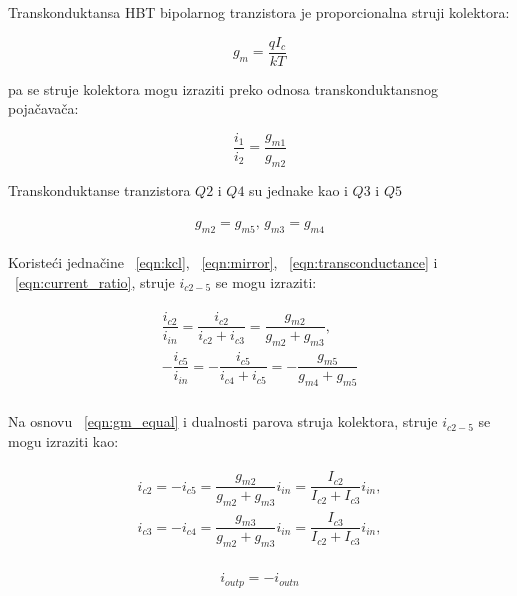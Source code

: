 \documentclass[journal,twocolumn,letterpaper]{IEEEJERM}
\begin{document}
Transkonduktansa HBT bipolarnog tranzistora je proporcionalna struji kolektora:

\begin{equation}
  \label{eqn:transconductance}
  g_{m} = \dfrac{qI_c}{kT}
\end{equation}

pa se struje kolektora mogu izraziti preko odnosa transkonduktansnog pojačavača:

\begin{equation}
  \label{eqn:current_ratio}
  \dfrac{i_1}{i_2} = \dfrac{g_{m1}}{g_{m2}}
\end{equation}

Transkonduktanse tranzistora $Q2$ i $Q4$ su jednake kao i $Q3$ i $Q5$

\begin{align}
  \label{eqn:gm_equal}
  \begin{split}
     g_{m2} = g_{m5}, \,
     g_{m3} = g_{m4}
  \end{split}
\end{align}


Koristeći jednačine ~\eqref{eqn:kcl}, ~\eqref{eqn:mirror}, ~\eqref{eqn:transconductance} i ~\eqref{eqn:current_ratio}, struje $i_{c2-5}$ se mogu izraziti:

\begin{align}
  \label{eqn:deriv2}
  \begin{split}
    \dfrac{i_{c2}}{i_{in}} = \dfrac{i_{c2}}{i_{c2} + i_{c3}} = \dfrac{g_{m2}}{g_{m2} + g_{m3}}, \\
    -\dfrac{i_{c5}}{i_{in}} = -\dfrac{i_{c5}}{i_{c4} + i_{c5}} = -\dfrac{g_{m5}}{g_{m4} + g_{m5}} \\
  \end{split}
\end{align}

Na osnovu ~\eqref{eqn:gm_equal} i dualnosti parova struja kolektora, struje $i_{c2-5}$ se mogu izraziti kao:

\begin{align}
  \label{eqn:deriv3}
  \begin{split}
    i_{c2} = -i_{c5} = \dfrac{g_{m2}}{g_{m2} + g_{m3}} i_{in} = \dfrac{I_{c2}}{I_{c2} + I_{c3}} i_{in}, \\
    i_{c3} = -i_{c4} = \dfrac{g_{m3}}{g_{m2} + g_{m3}} i_{in} = \dfrac{I_{c3}}{I_{c2} + I_{c3}} i_{in}, \\
  \end{split}
\end{align}

\begin{equation*}
  \label{eqn:out_current}
    i_{outp} = - i_{outn} 
\end{equation*}
\end{document}
